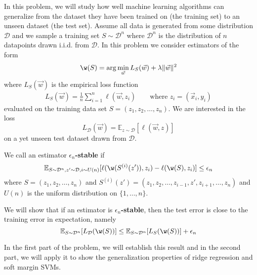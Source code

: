 \documentclass[preview]{standalone}
\begin{document}
\newcommand{\DD}{\mathcal{D}}
\newcommand{\E}{\mathbb{E}}


In this problem, we will study how well machine learning algorithms can
generalize from the dataset they have been trained on (the training set)
to an unseen dataset (the test set). Assume all data is generated from
some distribution $\mathcal D$ and we sample a training set
$S\sim \mathcal D^n$ where $\mathcal D^n$ is the distribution of $n$
datapoints drawn i.i.d{.} from $\mathcal D$. In this problem
we consider estimators of the form
\begin{equation}\label{learning_algorithm}
\w(S) = \arg\min_{\vec w} L_S(\vec w) + \lambda \lVert \vec w\rVert^2
\end{equation}
where $L_S(\vec w)$ is the empirical loss function
\begin{align*}
  L_S(\vec w) = \frac 1 n \sum_{i=1}^n \ell(\vec w, z_i)\qquad\text{where $z_i = (\vec x_i, y_i)$}
\end{align*}
evaluated on the training data set $S = (z_1, z_2, \dots, z_n)$. We are interested in the loss
\begin{equation}
L_{\DD} (\vec w) = \E_{z\sim \DD} [\ell(\vec w, z)]
\end{equation}
on a yet unseen test dataset drawn from $\DD$.

We call an estimator \textbf{$\epsilon_n$-stable} if
\begin{align*}
  \E_{S\sim \DD^{n}, z'\sim \DD, i\sim U(n)} [\ell(\w(S^{(i)}(z')), z_i) - \ell(\w(S), z_i)] \leq \epsilon_n
\end{align*}
where $S = (z_1, z_2, \dots, z_n)$ and $S^{(i)}(z') = (z_1, z_2, \dots, z_{i-1}, z', z_{i+1}, \dots, z_n)$
and $U(n)$ is the uniform distribution on $\{1, \dots, n\}$.

We will show that if an estimator is \textbf{$\epsilon_n$-stable},
then the test error is close to the training error in expectation, namely
\begin{equation}\label{test_error_bound}
\E_{S\sim \DD^n}[L_\DD(\w(S))] \leq \E_{S\sim \DD^n}[L_S(\w(S))] + \epsilon_n
\end{equation}

In the first part of the problem, we will establish this result and in the second
part, we will apply it to show the generalization properties of ridge regression and
soft margin SVMs.
\end{document}
